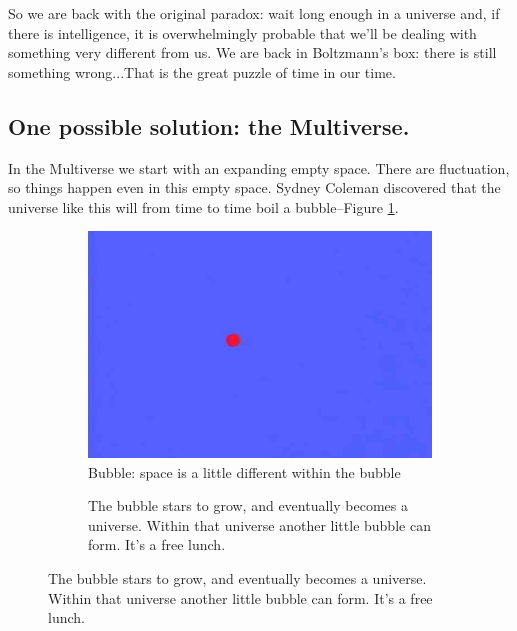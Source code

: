 \documentclass[]{article}
\begin{document}
	So we are back with the original paradox: wait long enough in a universe and, if there is intelligence, it is overwhelmingly probable that we'll be dealing with something very different from us. We are back in Boltzmann's box: there is still something wrong...That is the great puzzle of time in our time.

\subsection{One possible solution: the Multiverse.}	
In the Multiverse we start with an expanding empty space. There are fluctuation, so things happen even in this empty space. Sydney Coleman discovered that the universe like this will from time to time boil a bubble--Figure \ref{fig:wt1ws-bubble}.

\begin{figure}[H]
	\caption{The Multiverse: there are fluctuation, so things happen even in this empty space}
	\begin{subfigure}[t]{0.45\textwidth}
		\caption{Bubble: space is a little different within the bubble}\label{fig:wt1ws-bubble}
		\includegraphics[width=\textwidth]{wt1ws-bubble}
	\end{subfigure}
	\begin{subfigure}[t]{0.45\textwidth}
		\caption{The bubble stars to grow, and eventually becomes a  universe. Within that universe another little bubble can form. It's a free lunch.}\label{fig:wt1ws-bubble-grows}

\end{subfigure}
\end{figure}
\end{document}
